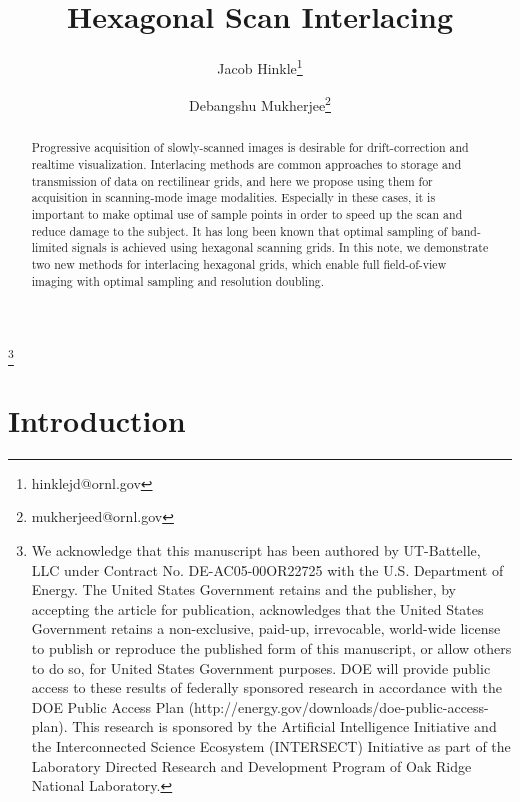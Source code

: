 \documentclass{article}
\title{Hexagonal Scan Interlacing}
\author{Jacob Hinkle\thanks{hinklejd@ornl.gov} 
}
\author{Debangshu Mukherjee\thanks{mukherjeed@ornl.gov}
}
\affil{
	Oak Ridge National Laboratory
}
\begin{document}
\maketitle
{
\renewcommand{\thefootnote}{}
\footnote{We acknowledge that this manuscript has been authored by UT-Battelle, LLC under Contract No. DE-AC05-00OR22725 with the U.S. Department of Energy. The United States Government retains and the publisher, by accepting the article for publication, acknowledges that the United States Government retains a non-exclusive, paid-up, irrevocable, world-wide license to publish or reproduce the published form of this manuscript, or allow others to do so, for United States Government purposes. DOE will provide public access to these results of federally sponsored research in accordance with the DOE Public Access Plan (http://energy.gov/downloads/doe-public-access-plan). This research is sponsored by the Artificial Intelligence Initiative and the Interconnected Science Ecosystem (INTERSECT) Initiative as part of the Laboratory Directed Research and Development Program of Oak Ridge National Laboratory.}
\setcounter{footnote}{0}
}
\begin{abstract}
	Progressive acquisition of slowly-scanned images is desirable for drift-correction and realtime visualization.
	Interlacing methods are common approaches to storage and transmission of data on rectilinear grids, and here we propose using them for acquisition in scanning-mode image modalities.
	Especially in these cases, it is important to make optimal use of sample points in order to speed up the scan and reduce damage to the subject.
	It has long been known that optimal sampling of band-limited signals is achieved using hexagonal scanning grids.
	In this note, we demonstrate two new methods for interlacing hexagonal grids, which enable full field-of-view imaging with optimal sampling and resolution doubling.
\end{abstract}

\section{Introduction}
\label{sec:intro}
\end{document}
